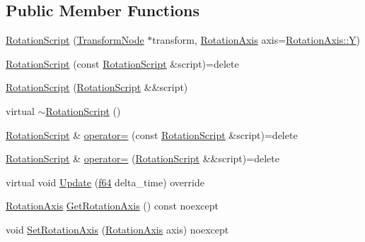 \subsection*{Public Member Functions}
\begin{DoxyCompactItemize}
\item 
\hyperlink{classmage_1_1_rotation_script_a731c7c3dbe7064fe876f80307952b595}{Rotation\+Script} (\hyperlink{structmage_1_1_transform_node}{Transform\+Node} $\ast$transform, \hyperlink{classmage_1_1_rotation_script_ad06cf896ce6dfe4f6676b263d15b4ee9}{Rotation\+Axis} axis=\hyperlink{classmage_1_1_rotation_script_ad06cf896ce6dfe4f6676b263d15b4ee9a57cec4137b614c87cb4e24a3d003a3e0}{Rotation\+Axis\+::Y})
\item 
\hyperlink{classmage_1_1_rotation_script_a52ee0473609565766fc1153678ee8b60}{Rotation\+Script} (const \hyperlink{classmage_1_1_rotation_script}{Rotation\+Script} \&script)=delete
\item 
\hyperlink{classmage_1_1_rotation_script_a5c6464f8e38fde0442c3b6f49a9cbed1}{Rotation\+Script} (\hyperlink{classmage_1_1_rotation_script}{Rotation\+Script} \&\&script)
\item 
virtual \hyperlink{classmage_1_1_rotation_script_adc2af2d6ed93558fd66b569297b294d0}{$\sim$\+Rotation\+Script} ()
\item 
\hyperlink{classmage_1_1_rotation_script}{Rotation\+Script} \& \hyperlink{classmage_1_1_rotation_script_a738c666a1aa42412da82d24368b20dfe}{operator=} (const \hyperlink{classmage_1_1_rotation_script}{Rotation\+Script} \&script)=delete
\item 
\hyperlink{classmage_1_1_rotation_script}{Rotation\+Script} \& \hyperlink{classmage_1_1_rotation_script_a093aa3f50dcbbe68847bb0b5f6363e7a}{operator=} (\hyperlink{classmage_1_1_rotation_script}{Rotation\+Script} \&\&script)=delete
\item 
virtual void \hyperlink{classmage_1_1_rotation_script_a0d9c25142e10519b787b201b2b581433}{Update} (\hyperlink{namespacemage_ab935747c6941320bd6214b5a5f265b09}{f64} delta\+\_\+time) override
\item 
\hyperlink{classmage_1_1_rotation_script_ad06cf896ce6dfe4f6676b263d15b4ee9}{Rotation\+Axis} \hyperlink{classmage_1_1_rotation_script_a6fbbbec1bd610da2c917d1ef2d05f556}{Get\+Rotation\+Axis} () const noexcept
\item 
void \hyperlink{classmage_1_1_rotation_script_a32c12db9206002a1aa2dd0e2e3b4ecd7}{Set\+Rotation\+Axis} (\hyperlink{classmage_1_1_rotation_script_ad06cf896ce6dfe4f6676b263d15b4ee9}{Rotation\+Axis} axis) noexcept
\end{DoxyCompactItemize}
